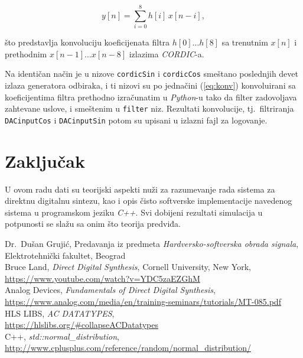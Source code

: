 \documentclass[conference]{IEEEtran}
\begin{document}
\begin{equation}\label{eq:konv}
y[n] = \sum_{i=0}^{8}{h[i]\,x[n-i]} ,
\end{equation}

\noindent što predstavlja konvoluciju koeficijenata filtra $h[0]\ldots h[8]$ sa trenutnim $x[n]$ i prethodnim $x[n-1]\ldots x[n-8]$ izlazima \textit{CORDIC}-a.

Na identičan način je u nizove \texttt{cordicSin} i \texttt{cordicCos} smeštano poslednjih devet izlaza generatora odbiraka, i ti nizovi su po jednačini (\ref{eq:konv}) konvoluirani sa koeficijentima filtra prethodno izračunatim u \textit{Python}-u tako da filter zadovoljava zahtevane uslove, i smeštenim u \texttt{filter} niz. Rezultati konvolucije, tj.~filtriranja \texttt{DACinputCos} i \texttt{DACinputSin} potom su upisani u izlazni fajl za logovanje.
\bigskip

\section{Zaključak}
U ovom radu dati su teorijski aspekti nuži za razumevanje rada sistema za direktnu digitalnu sintezu, kao i opis čisto softverske implementacije navedenog sistema u programskom jeziku \textit{C++}. Svi dobijeni rezultati simulacija u potpunosti se slažu sa onim što teorija predviđa.

\begin{thebibliography}{00}
	 Dr.~Dušan Grujić, Predavanja iz predmeta \textsl{Hardversko-softverska obrada signala}, Elektrotehnički fakultet, Beograd\\
	 Bruce Land, \textsl{Direct Digital Synthesis}, Cornell University, New York, \\\url{https://www.youtube.com/watch?v=YDC5zaEZGhM}\\
	 Analog Devices, \textsl{Fundamentals of Direct Digital Synthesis}, \\\url{https://www.analog.com/media/en/training-seminars/tutorials/MT-085.pdf}\\
	 HLS LIBS, \textsl{AC DATATYPES}, \\\url{https://hlslibs.org/#collapseACDatatypes}\\
	 C++, \textsl{std::normal\_distribution}, \\\url{http://www.cplusplus.com/reference/random/normal_distribution/}\\
\end{thebibliography}
\end{document}
